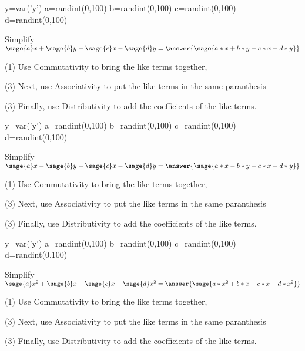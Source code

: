 \documentclass{ximera}
\begin{document}
\begin{problem}
\begin{sagesilent}
y=var('y')
a=randint(0,100)
b=randint(0,100)
c=randint(0,100)
d=randint(0,100)
\end{sagesilent}
Simplify $\sage{a}x+\sage{b}y-\sage{c}x-\sage{d}y=\answer{\sage{a*x+b*y-c*x-d*y}}$

\begin{hint}
\item[(1)] Use Commutativity to bring the like terms together, 
\item[(3)] Next, use Associativity to put the like terms in the same paranthesis 
\item[(3)] Finally, use Distributivity to add the coefficients of the like terms.
\end{hint}
\end{problem}

\begin{problem}
\begin{sagesilent}
y=var('y')
a=randint(0,100)
b=randint(0,100)
c=randint(0,100)
d=randint(0,100)
\end{sagesilent}
Simplify $\sage{a}x-\sage{b}y-\sage{c}x-\sage{d}y=\answer{\sage{a*x-b*y-c*x-d*y}}$

\begin{hint}
\item[(1)] Use Commutativity to bring the like terms together, 
\item[(3)] Next, use Associativity to put the like terms in the same paranthesis 
\item[(3)] Finally, use Distributivity to add the coefficients of the like terms.
\end{hint}

\end{problem}


\begin{problem}
\begin{sagesilent}
y=var('y')
a=randint(0,100)
b=randint(0,100)
c=randint(0,100)
d=randint(0,100)
\end{sagesilent}
Simplify $\sage{a}x^2+\sage{b}x-\sage{c}x-\sage{d}x^2=\answer{\sage{a*x^2+b*x-c*x-d*x^2}}$

\begin{hint}
\item[(1)] Use Commutativity to bring the like terms together, 
\item[(3)] Next, use Associativity to put the like terms in the same paranthesis 
\item[(3)] Finally, use Distributivity to add the coefficients of the like terms.
\end{hint}

\end{problem}
\end{document}
